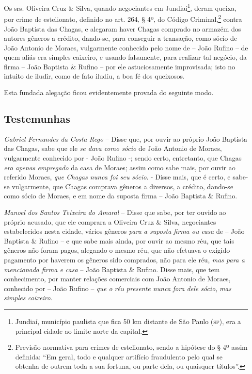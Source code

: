\asterisc{}

Os srs. Oliveira Cruz \& Silva, quando negociantes em
Jundiaí\footnote{ Jundiaí, município paulista que fica 50 km distante
  de São Paulo (\textsc{sp}), era a principal cidade ao limite norte da capital.},
deram queixa, por crime de estelionato, definido no art. 264, § 4º, do
Código Criminal,\footnote{ Previsão normativa para crimes de
  estelionato, sendo a hipótese do § 4º assim definida: ``Em geral, todo
  e qualquer artifício fraudulento pelo qual se obtenha de outrem toda a
  sua fortuna, ou parte dela, ou quaisquer títulos''.} contra João
Baptista das Chagas, e alegaram haver Chagas comprado no armazém dos
autores gêneros a crédito, dando-se, para conseguir a transação, como
sócio de João Antonio de Moraes, vulgarmente conhecido pelo nome de --
João Rufino -- de quem aliás era simples caixeiro, e usando falsamente,
para realizar tal negócio, da firma -- João Baptista \& Rufino -- por
ele astuciosamente improvisada; isto no intuito de iludir, como de fato
iludiu, a boa fé dos queixosos.

Esta fundada alegação ficou evidentemente provada do seguinte modo.

\subsection{Testemunhas}

\emph{Gabriel Fernandes da Costa Rego} -- Disse que, por ouvir ao
próprio João Baptista das Chagas, sabe que ele \emph{se dava como sócio}
de João Antonio de Moraes, vulgarmente conhecido por - João Rufino -;
sendo certo, entretanto, que Chagas \emph{era apenas empregado} da casa
de Moraes; assim como sabe mais, por ouvir ao referido Moraes, \emph{que
Chagas nunca foi seu sócio}. - Disse mais, que é certo, e sabe-se
vulgarmente, que Chagas comprava gêneros a diversos, a crédito, dando-se
como sócio de Moraes, e em nome da suposta firma -- João Baptista \&
Rufino.

\emph{Manoel dos Santos Teixeira do Amaral} -- Disse que sabe, por ter
ouvido ao próprio acusado, que ele comprara a Oliveira Cruz \& Silva,
negociantes estabelecidos nesta cidade, vários gêneros \emph{para a
suposta firma ou casa} de -- João Baptista \& Rufino -- e que sabe mais
ainda, por ouvir ao mesmo réu, que tais gêneros não foram pagos,
alegando o mesmo réu, que não efetuava o exigido pagamento por haverem
os gêneros sido comprados, não para ele réu, \emph{mas para a mencionada
firma e casa} -- João Baptista \& Rufino. Disse mais, que tem
conhecimento, por manter relações comerciais com João Antonio de Moraes,
conhecido por -- João Rufino -- \emph{que o réu presente nunca fora dele
sócio}, \emph{mas simples caixeiro}.

